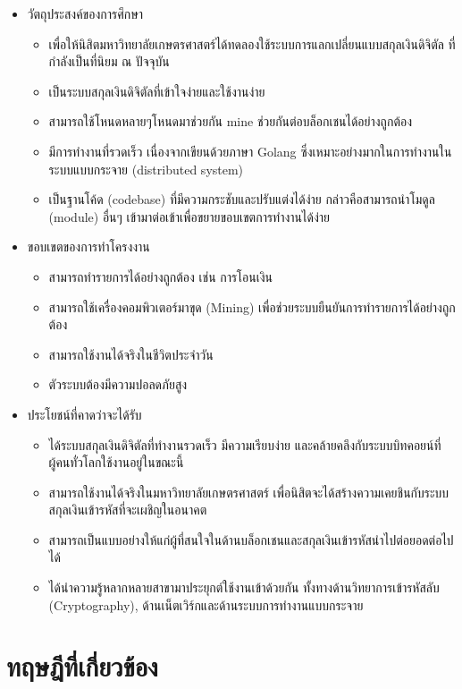 \documentclass[letterpaper, 10pt, conference]{ieeeconf}
\begin{document}
\begin{itemize}
	\item {วัตถุประสงค์ของการศึกษา}
	\begin{itemize}
		\item เพื่อให้นิสิตมหาวิทยาลัยเกษตรศาสตร์ได้ทดลองใช้ระบบการแลกเปลี่ยนแบบสกุลเงินดิจิตัล ที่กำลังเป็นที่นิยม ณ ปัจจุบัน
		\item เป็นระบบสกุลเงินดิจิตัลที่เข้าใจง่ายและใช้งานง่าย
		\item สามารถใช้โหนดหลายๆโหนดมาช่วยกัน mine ช่วยกันต่อบล็อกเชนได้อย่างถูกต้อง
		\item มีการทำงานที่รวดเร็ว เนื่องจากเขียนด้วยภาษา Golang ซึ่งเหมาะอย่างมากในการทำงานในระบบแบบกระจาย (distributed system)
		\item เป็นฐานโค้ด (codebase) ที่มีความกระชับและปรับแต่งได้ง่าย กล่าวคือสามารถนำโมดูล (module) อื่นๆ เข้ามาต่อเข้าเพื่อขยายขอบเขตการทำงานได้ง่าย
	\end{itemize}
	\item {ขอบเขตของการทำโครงงาน}
	\begin{itemize}
		\item สามารถทำรายการได้อย่างถูกต้อง เช่น การโอนเงิน
		\item สามารถใช้เครื่องคอมพิวเตอร์มาขุด (Mining) เพื่อช่วยระบบยืนยันการทำรายการได้อย่างถูกต้อง
		\item สามารถใช้งานได้จริงในชีวิตประจำวัน
		\item ตัวระบบต้องมีความปอลดภัยสูง
	\end{itemize}
	\item {ประโยชน์ที่คาดว่าจะได้รับ}
	\begin{itemize}
		\item ได้ระบบสกุลเงินดิจิตัลที่ทำงานรวดเร็ว มีความเรียบง่าย และคล้ายคลึงกับระบบบิทคอยน์ที่ผู้คนทั่วโลกใช้งานอยู่ในขณะนี้
		\item สามารถใช้งานได้จริงในมหาวิทยาลัยเกษตรศาสตร์ เพื่อนิสิตจะได้สร้างความเคยชินกับระบบสกุลเงินเข้ารหัสที่จะเผชิญในอนาคต
		\item สามารถเป็นแบบอย่างให้แก่ผู้ที่สนใจในด้านบล็อกเชนและสกุลเงินเข้ารหัสนำไปต่อยอดต่อไปได้
		\item ได้นำความรู้หลากหลายสาขามาประยุกต์ใช้งานเข้าด้วยกัน ทั้งทางด้านวิทยาการเข้ารหัสลับ (Cryptography), ด้านเน็ตเวิร์กและด้านระบบการทำงานแบบกระจาย
	\end{itemize}
\end{itemize}

\section{ทฤษฎีที่เกี่ยวข้อง}
\end{document}
